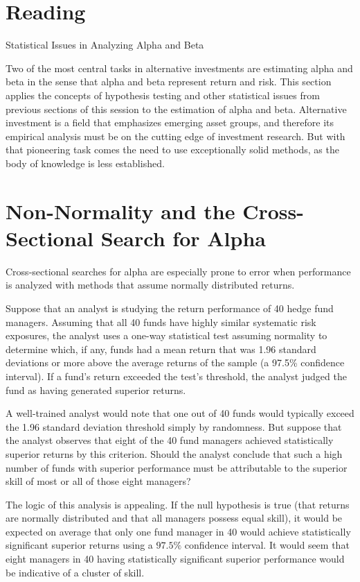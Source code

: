 \documentclass[11pt]{article}
\begin{document}
\section*{Reading}
Statistical Issues in Analyzing Alpha and Beta

Two of the most central tasks in alternative investments are estimating alpha and beta in the sense that alpha and beta represent return and risk. This section applies the concepts of hypothesis testing and other statistical issues from previous sections of this session to the estimation of alpha and beta. Alternative investment is a field that emphasizes emerging asset groups, and therefore its empirical analysis must be on the cutting edge of investment research. But with that pioneering task comes the need to use exceptionally solid methods, as the body of knowledge is less established.

\section*{Non-Normality and the Cross-Sectional Search for Alpha}
Cross-sectional searches for alpha are especially prone to error when performance is analyzed with methods that assume normally distributed returns.

Suppose that an analyst is studying the return performance of 40 hedge fund managers. Assuming that all 40 funds have highly similar systematic risk exposures, the analyst uses a one-way statistical test assuming normality to determine which, if any, funds had a mean return that was 1.96 standard deviations or more above the average returns of the sample (a 97.5\% confidence interval). If a fund's return exceeded the test's threshold, the analyst judged the fund as having generated superior returns.

A well-trained analyst would note that one out of 40 funds would typically exceed the 1.96 standard deviation threshold simply by randomness. But suppose that the analyst observes that eight of the 40 fund managers achieved statistically superior returns by this criterion. Should the analyst conclude that such a high number of funds with superior performance must be attributable to the superior skill of most or all of those eight managers?

The logic of this analysis is appealing. If the null hypothesis is true (that returns are normally distributed and that all managers possess equal skill), it would be expected on average that only one fund manager in 40 would achieve statistically significant superior returns using a $97.5 \%$ confidence interval. It would seem that eight managers in 40 having statistically significant superior performance would be indicative of a cluster of skill.
\end{document}
